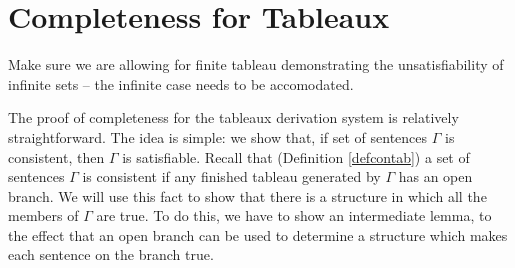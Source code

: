 \section{Completeness for Tableaux}

Make sure we are allowing for finite tableau demonstrating the unsatisfiability of infinite sets – the infinite case needs to be accomodated.



The proof of completeness for the tableaux derivation system is relatively straightforward. The idea is simple: we show that, if set of sentences $\Gamma$ is consistent, then $\Gamma$ is satisfiable. Recall that (Definition \ref{defcontab}) a set of sentences $\Gamma$ is consistent if any finished tableau generated by $\Gamma$ has an open branch. We will use this fact to show that there is a structure in which all the members of $\Gamma$ are true. To do this, we have to show an intermediate lemma, to the effect that an open branch can be used to determine a structure which makes each sentence on the branch true.


